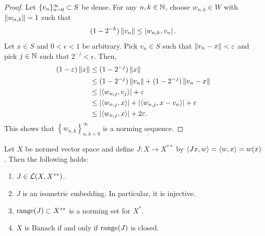 \documentclass[a4paper]{article}
\begin{document}
\begin{proof}
  
Let $\{ v_n \}_{n=0}^\infty \subset S$ be dense. 
For any $n, k \in \mathbb{N}$, choose $w_{n, k} \in W$ with 
$\left\lVert w_{n, k}\right\rVert = 1$ such that 
\[
(1 - 2^{-k}) \left\lVert v_n\right\rVert \leq \left\lvert w_{n, k}, v_n\right\rvert.
\]
Let $x \in S$ and $0 < \epsilon < 1$ be arbitrary. 
Pick $v_n \in S$ such that $\left\lVert v_n - x\right\rVert < \varepsilon$ and 
pick $j \in \mathbb{N}$ such that $2^{-j} < \epsilon$. Then, 
\[
\begin{aligned}
(1 - \varepsilon) \left\lVert x\right\rVert 
&\leq (1 - 2^{-j}) \left\lVert x\right\rVert  \\
&\leq (1 - 2^{-j}) \left\lVert v_n\right\rVert + (1 - 2^{-j}) \left\lVert v_n - x\right\rVert \\
&\leq \left\lvert \langle w_{n, j}, v_j \rangle\right\rvert + \varepsilon \\
&\leq \left\lvert \langle w_{n, j}, x \rangle\right\rvert + \left\lvert \langle w_{n, j}, 
x - v_n \rangle\right\rvert + \varepsilon \\
&\leq \left\lvert \langle w_{n, j}, x \rangle\right\rvert + 2 \varepsilon.
\end{aligned}
\]
This shows that $\left\{ w_{n, k} \right\}_{n, k = 0}^\infty$
is a norming sequence.

\end{proof}

\begin{thm}
Let $X$ be normed vector space and define $J: X \to X^{**}$ 
by $\left\langle Jx, w \right\rangle = \left\langle w, x \right\rangle = w(x)$. Then the following
holds:
\begin{enumerate}
\item $J \in \mathcal{L}(X, X^{**})$. 
\item $J$ is an isometric embedding. In particular, it is 
injective.
\item $\operatorname{range}(J) \subset X^{**}$ is a norming set for $X^*$.
\item $X$ is Banach if and only if $\operatorname{range}(J)$ is closed.
\end{enumerate}
\end{thm}
\end{document}
